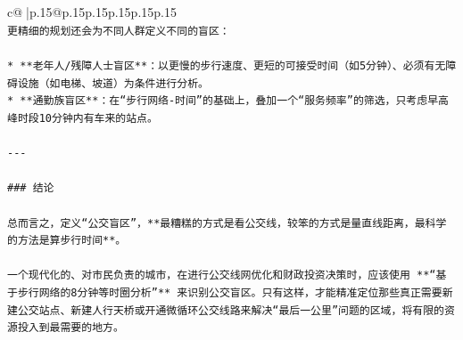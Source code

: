 \documentclass{article}
\begin{document}
{\begin{supertabular}{c@{$\;$}|p{.15\linewidth}@{}p{.15\linewidth}p{.15\linewidth}p{.15\linewidth}p{.15\linewidth}p{.15\linewidth}}
{{{\\ 
\texttt{更精细的规划还会为不同人群定义不同的盲区：} \\
\\ 
\texttt{*   **老年人/残障人士盲区**：以更慢的步行速度、更短的可接受时间（如5分钟）、必须有无障碍设施（如电梯、坡道）为条件进行分析。} \\
\texttt{*   **通勤族盲区**：在“步行网络{-}时间”的基础上，叠加一个“服务频率”的筛选，只考虑早高峰时段10分钟内有车来的站点。} \\
\\ 
\texttt{{-}{-}{-}} \\
\\ 
\texttt{\#\#\# 结论} \\
\\ 
\texttt{总而言之，定义“公交盲区”，**最糟糕的方式是看公交线，较笨的方式是量直线距离，最科学的方法是算步行时间**。} \\
\\ 
\texttt{一个现代化的、对市民负责的城市，在进行公交线网优化和财政投资决策时，应该使用 **“基于步行网络的8分钟等时圈分析”** 来识别公交盲区。只有这样，才能精准定位那些真正需要新建公交站点、新建人行天桥或开通微循环公交线路来解决“最后一公里”问题的区域，将有限的资源投入到最需要的地方。} \\
            }
        }
    }
     \\ \\


\end{supertabular}}
\end{document}
